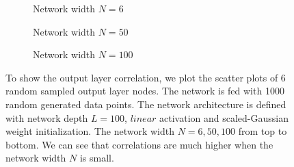 \begin{figure}
  \centering
  \newcommand{\myWidth}{.95\textwidth}
  \begin{subfigure}{\myWidth}
    \centering
    \caption{Network width $N=6$}
    \label{fig:sec4_sim11_a}
  \end{subfigure}%
  
  \begin{subfigure}{\myWidth}
    \centering
    \caption{Network width $N=50$}
    \label{fig:sec4_sim11_b}
  \end{subfigure}%
  
  \begin{subfigure}{\myWidth}
    \centering
    \caption{Network width $N=100$}
    \label{fig:sec4_sim11_c}
  \end{subfigure}%
  
\caption[Scatter plots for the $linear$ activation and the scaled-Gaussian initialization.]
{To show the output layer correlation, we plot the scatter plots of 6 random sampled output
layer nodes. The network is fed with 1000 random generated data points.
The network architecture is defined with network depth $L=100$,
$linear$ activation and scaled-Gaussian weight initialization. The network width
$N=6, 50, 100$ from top to bottom. We can see that correlations are much higher
when the network width $N$ is small.}
\label{fig:sec4_sim11}
\end{figure}



